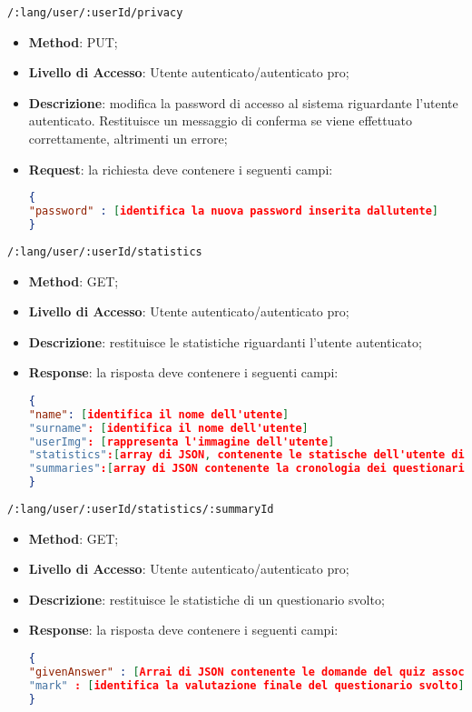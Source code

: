 	\item \texttt{/:lang/user/:userId/privacy}
		\begin{itemize}
			\item \textbf{Method}: PUT;
			\item \textbf{Livello di Accesso}: Utente autenticato/autenticato pro;
			\item \textbf{Descrizione}: modifica la password di accesso al sistema riguardante l'utente autenticato. Restituisce un messaggio di conferma se viene effettuato correttamente, altrimenti un errore;
			\item \textbf{Request}: la richiesta deve contenere i seguenti campi:	
\begin{lstlisting}[language=json,firstnumber=1]
{
"password" : [identifica la nuova password inserita dallutente]
}	

\end{lstlisting}
		\end{itemize}
		
	\item \texttt{/:lang/user/:userId/statistics}
		\begin{itemize}
			\item \textbf{Method}: GET;
			\item \textbf{Livello di Accesso}: Utente autenticato/autenticato pro;
			\item \textbf{Descrizione}: restituisce le statistiche riguardanti l'utente autenticato; 
			\item \textbf{Response}: la risposta deve contenere i seguenti campi:	
\begin{lstlisting}[language=json,firstnumber=1]
{
"name": [identifica il nome dell'utente]
"surname": [identifica il nome dell'utente]
"userImg": [rappresenta l'immagine dell'utente]
"statistics":[array di JSON, contenente le statische dell'utente di ogni argomento]
"summaries":[array di JSON contenente la cronologia dei questionari svolti dall'utente]   
}	

\end{lstlisting}
		\end{itemize}
		
		
	\item \texttt{/:lang/user/:userId/statistics/:summaryId}
	\begin{itemize}
		\item \textbf{Method}: GET;
		\item \textbf{Livello di Accesso}: Utente autenticato/autenticato pro;
		\item \textbf{Descrizione}: restituisce le statistiche di un questionario svolto; 
		\item \textbf{Response}: la risposta deve contenere i seguenti campi:	
\begin{lstlisting}[language=json,firstnumber=1]
{
"givenAnswer" : [Arrai di JSON contenente le domande del quiz associate alle risposte date dall'utente]
"mark" : [identifica la valutazione finale del questionario svolto]
}	
\end{lstlisting}
	\end{itemize}
	